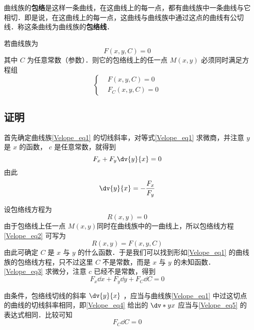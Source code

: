 
曲线族的\textbf{包络}是这样一条曲线，在这曲线上的每一点，都有曲线族中一条曲线与它相切．即是说，在这曲线上的每一点，这曲线与曲线族中通过这点的曲线有公切线．称这条曲线为曲线族的\textbf{包络线}．

若曲线族为 
\begin{equation}\label{Velope_eq1}
F(x,y,C)=0
\end{equation}
其中 $C$ 为任意常数（参数）．则它的包络线上的任一点 $M(x,y)$ 必须同时满足方程组
\begin{equation}\label{Velope_eq6}
\left\{\begin{aligned}
&F(x,y,C)=0\\
&F_C(x,y,C)=0
\end{aligned}\right.
\end{equation}
\subsection{证明}
首先确定曲线族\autoref{Velope_eq1} 的切线斜率，对等式\autoref{Velope_eq1} 求微商，并注意 $y$ 是 $x$ 的函数， $c$ 是任意常数，就得到
\begin{equation}
F_x+F_y\dv{y}{x}=0
\end{equation}
由此
\begin{equation}\label{Velope_eq5}
\dv{y}{x}=-\frac{F_x}{F_y}
\end{equation}

设包络线方程为
\begin{equation}\label{Velope_eq2}
R(x,y)=0
\end{equation}
由于包络线上任一点 $M(x,y)$同时在曲线族中的一曲线上，所以包络线方程\autoref{Velope_eq2} 可写为
\begin{equation}\label{Velope_eq3}
R(x,y)=F(x,y,C)
\end{equation}
由此可确定 $C$ 是 $x$ 与 $y$ 的什么函数．于是我们可以找到形如\autoref{Velope_eq1} 的曲线族的包络线方程，只不过这里 $C$ 不是常数，而是 $x$ 与 $y$ 的未知函数．\autoref{Velope_eq3} 求微分，注意 $c$ 已经不是常数，得到
\begin{equation}\label{Velope_eq4}
F_x\dd x+F_y\dd y+F_C\dd C=0
\end{equation}

由条件，包络线切线的斜率 $\dv{y}{x}$ ，应当与曲线族\autoref{Velope_eq1} 中过这切点的曲线的切线斜率相同，即\autoref{Velope_eq4} 给出的 $\dv*{y}{x}$ 应当与\autoref{Velope_eq5} 的表达式相同．比较可知
\begin{equation}
F_C\dd C=0
\end{equation}

